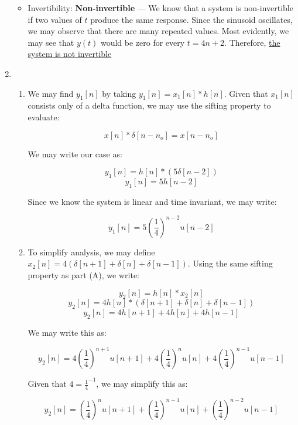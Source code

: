 \begin{enumerate}[label=\textbf{\Roman*}.]
\begin{itemize}
      \item Invertibility: \textbf{Non-invertible} — We know that a system is non-invertible if two values of $t$ produce the same response. Since the sinusoid oscillates, we may observe that there are many repeated values. Most evidently, we may see that $y(t)$ would be zero for every $t=4n+2$. Therefore, \underline{the system is not invertible}

    \end{itemize}

  \item

    \begin{enumerate}[label=\Alph*.]

      \item We may find $y_1[n]$ by taking $y_1[n]=x_1[n]*h[n]$. Given that $x_1[n]$ consists only of a delta function, we may use the sifting property to evaluate:

        $$x[n]*\delta[n-n_o]=x[n-n_o]$$

        We may write our case as:

        $$y_1[n]=h[n]*(5\delta[n-2])$$
        $$y_1[n]=5h[n-2]$$

        Since we know the system is linear and time invariant, we may write:

        $$\boxed{y_1[n]=5\left( \frac{1}{4} \right)^{n-2}u[n-2]}$$

      \item To simplify analysis, we may define $x_2[n]=4\left( \delta[n+1]+\delta[n]+\delta[n-1] \right)$. Using the same sifting property as part (A), we write:

        $$y_2[n]=h[n]*x_2[n]$$
        $$y_2[n]=4h[n]*(\delta[n+1]+\delta[n]+\delta[n-1])$$
        $$y_2[n]=4h[n+1]+4h[n]+4h[n-1]$$

        We may write this as:

        $$y_2[n]=4\left( \frac{1}{4} \right)^{n+1}u[n+1]+4\left( \frac{1}{4} \right)^{n}u[n]+4\left( \frac{1}{4} \right)^{n-1}u[n-1]$$

        Given that $4=\frac{1}{4}^{-1}$, we may simplify this as:

        $$\boxed{y_2[n]=\left( \frac{1}{4} \right)^{n}u[n+1]+\left( \frac{1}{4} \right)^{n-1}u[n]+\left( \frac{1}{4} \right)^{n-2}u[n-1]}$$

    \end{enumerate}

\end{enumerate}



